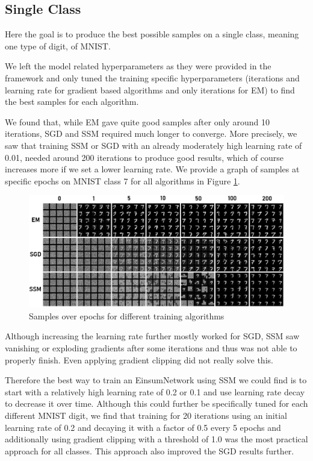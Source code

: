 \subsection{Single Class}
\label{sec:exp_mnist_single}

Here the goal is to produce the best possible samples on a single class, meaning one type of digit, of MNIST.

We left the model related hyperparameters as they were provided in the framework and only tuned the training specific hyperparameters 
(iterations and learning rate for gradient based algorithms and only iterations for EM) to find the best samples for each algorithm. 

We found that, while EM gave quite good samples after only around 10 iterations, SGD and SSM required much longer to converge. 
More precisely, we saw that training SSM or SGD with an already moderately high learning rate
of 0.01, needed around 200 iterations to produce good results, which of course increases more if we set a lower learning rate.
We provide a graph of samples at specific epochs on MNIST class 7 for all algorithms in Figure \ref{fig:mnist_epochs}.\\ 

\begin{figure}[H]
    \centering
    \includegraphics[width=\textwidth]{figures/einsum/mnist/epoch_comparison.png}
    \caption{Samples over epochs for different training algorithms}
    \label{fig:mnist_epochs}
\end{figure}

Although increasing the learning rate further mostly worked for SGD, SSM saw vanishing or exploding gradients after some iterations and thus was
not able to properly finish. Even applying gradient clipping did not really solve this. 

Therefore the best way to train an EinsumNetwork using SSM we could find is to start with a relatively 
high learning rate of 0.2 or 0.1 and use learning rate decay to decrease it over time. Although
this could further be specifically tuned for each different MNIST digit, we find that training for 
20 iterations using an initial learning rate of 0.2 and decaying it with a factor of 0.5 every 5 epochs 
and additionally using gradient clipping with a threshold of 1.0 was the most practical approach for all classes.
This approach also improved the SGD results further.

